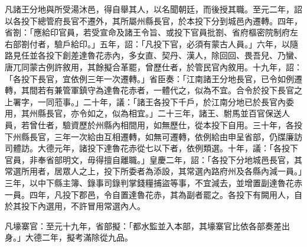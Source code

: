 \begin{pinyinscope}
 凡諸王分地與所受湯沐邑，得自舉其人，以名聞朝廷，而後授其職。至元二年，詔以各投下總管府長官不遷外，其所屬州縣長官，於本投下分到城邑內遷轉。四年，省劄：「應給印官員，若受宣命及諸王令旨、或投下官員批劄、省府樞密院制府左右部劄付者，驗戶給印。」五年，詔：「凡投下官，必須有蒙古人員。」六年，以隨路見任並各投下創差達魯花赤內，多女直、契丹、漢人，除回回、畏吾兒、乃蠻、唐兀同蒙古例許敘用，其餘擬合革罷，曾歷仕者，於管民官內敘用。十九年，詔：「各投下長官，宜依例三年一次遷轉。」省臣奏：「江南諸王分地長官，已令如例遷轉，其間若有兼管軍鎮守為達魯花赤者，一體代之，似為不宜。合令於投下長官之上署字，一同蒞事。」二十年，議：「諸王各投下千戶，於江南分地已於長官內委用，其州縣長官，亦令如之，似為相宜。」二十三年，諸王、駙馬並百官保送人員，若曾仕者，驗資歷於州縣內相間用，如無歷仕，從本投下自用。三十年，各投下州縣長官，三年一次給由互相遷轉，如無可遷轉，依例給由申呈省部，仍牒廉訪司體訪。大德元年，諸投下達魯花赤從七以下者，依例類選。十年，議：「各投下官員，非奉省部明文，毋得擅自離職。」皇慶二年，詔：「各投下分地城邑長官，其常選所用者，居眾人之上，投下所委者為添設，其常選內路府州及各縣內減一員。」三年，以中下縣主簿、錄事司錄判掌錢糧捕盜等事，不宜減去，並增置副達魯花赤一員。四年，凡投下郡邑，令自置達魯花赤，其為副者罷之。各投下有闕用人，自於其投下內選用，不許冒用常選內人。



 凡壕寨官：至元十九年，省部擬：「都水監並入本部，其壕寨官比依各部奏差出身。」大德二年，擬考滿除從九品。




\end{pinyinscope}
